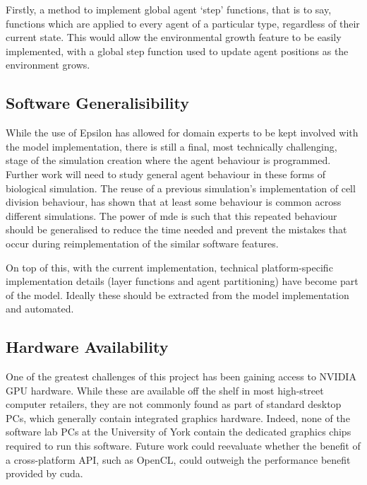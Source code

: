 \documentclass{UoYCSproject}
\begin{document}
Firstly, a method to implement global agent `step' functions, that is to say, functions which are applied to every agent of a particular type, regardless of their current state.
This would allow the environmental growth feature to be easily implemented, with a global step function used to update agent positions as the environment grows.



\subsection{Software Generalisibility}%
While the use of Epsilon has allowed for domain experts to be kept involved with the model implementation, there is still a final, most technically challenging, stage of the simulation creation where the agent behaviour is programmed.
Further work will need to study general agent behaviour in these forms of biological simulation.
The reuse of a previous simulation's implementation of cell division behaviour, has shown that at least some behaviour is common across different simulations.
The power of \gls{mde} is such that this repeated behaviour should be generalised to reduce the time needed and prevent the mistakes that occur during reimplementation of the similar software features.

On top of this, with the current implementation, technical platform-specific implementation details (layer functions and agent partitioning) have become part of the model.
Ideally these should be extracted from the model implementation and automated.

\subsection{Hardware Availability}
One of the greatest challenges of this project has been gaining access to NVIDIA GPU hardware.
While these are available off the shelf in most high-street computer retailers, they are not commonly found as part of standard desktop PCs, which generally contain integrated graphics hardware.
Indeed, none of the software lab PCs at the University of York contain the dedicated graphics chips required to run this software.
Future work could reevaluate whether the benefit of a cross-platform API, such as OpenCL, could outweigh the performance benefit provided by \acrshort{cuda}.
\end{document}
